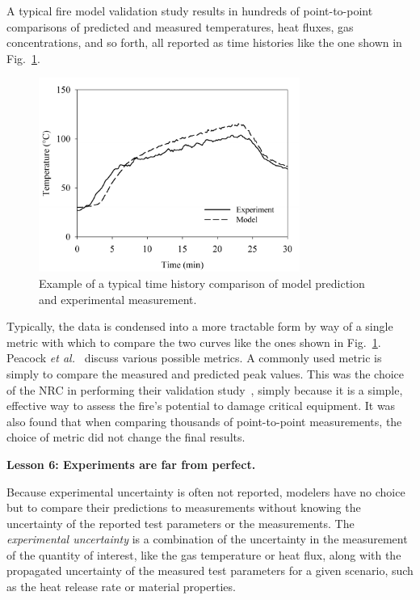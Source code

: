 \documentclass[fleqn,b5paper]{article}
\begin{document}
A typical fire model validation study results in hundreds of point-to-point comparisons of predicted and measured temperatures, heat fluxes, gas concentrations, and so forth, all reported as time histories like the one shown in Fig.~\ref{temp_history}.
\begin{figure}[ht]
\begin{center}
\includegraphics[height=2.5in]{../FDS_Validation_Guide/FIGURES/sample_time_history}
\end{center}
\caption[Sample time history plots.]{Example of a typical time history comparison of model prediction and experimental measurement.}
\label{temp_history}
\end{figure}
Typically, the data is condensed into a more tractable form by way of a single metric with which to compare the two curves like the ones shown in Fig.~\ref{temp_history}. Peacock {\em et al.}~\cite{Peacock:FSJ1999} discuss various possible metrics. A commonly used metric is simply to compare the measured and predicted peak values. This was the choice of the NRC in performing their validation study~\cite{NUREG_1824}, simply because it is a simple, effective way to assess the fire's potential to damage critical equipment. It was also found that when comparing thousands of point-to-point measurements, the choice of metric did not change the final results.


\vspace{\parskip}
{\bf Lesson 6: Experiments are far from perfect.}

Because experimental uncertainty is often not reported, modelers have no choice but to compare their predictions to measurements without knowing the uncertainty of the reported test parameters or the measurements. The {\em experimental uncertainty} is a combination of the uncertainty in the measurement of the quantity of interest, like the gas temperature or heat flux, along with the propagated uncertainty of the measured test parameters for a given scenario, such as the heat release rate or material properties.
\end{document}
